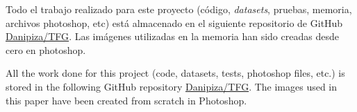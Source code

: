 	Todo el trabajo realizado para este proyecto (código, \textit{datasets}, pruebas, memoria, archivos photoshop, etc) está almacenado en el siguiente repositorio de GitHub \href{https://github.com/Danipiza/TFG}{Danipiza/TFG}. Las imágenes utilizadas en la memoria han sido creadas desde cero en photoshop.
	
	All the work done for this project (code, datasets, tests, photoshop files, etc.) is stored in the following GitHub repository \href{https://github.com/Danipiza/TFG}{Danipiza/TFG}. The images used in this paper have been created from scratch in Photoshop.















